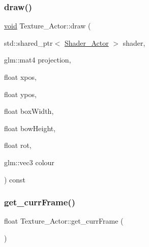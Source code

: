 \mbox{\label{classTexture__Actor_aa3cffcf3b8d123731999d986ab20afd1}} 
\subsubsection{\texorpdfstring{draw()}{draw()}\hspace{0.1cm}{\footnotesize\ttfamily [2/2]}}
{\footnotesize\ttfamily \hyperlink{imgui__impl__opengl3__loader_8h_ac668e7cffd9e2e9cfee428b9b2f34fa7}{void} Texture\+\_\+\+Actor\+::draw (\begin{DoxyParamCaption}\item[{std\+::shared\+\_\+ptr$<$ \hyperlink{classShader__Actor}{Shader\+\_\+\+Actor} $>$}]{shader,  }\item[{glm\+::mat4}]{projection,  }\item[{float}]{xpos,  }\item[{float}]{ypos,  }\item[{float}]{box\+Width,  }\item[{float}]{bow\+Height,  }\item[{float}]{rot,  }\item[{glm\+::vec3}]{colour }\end{DoxyParamCaption}) const}

\mbox{\label{classTexture__Actor_a8c5360d7d8edfa2a50832e457509c061}} 
\subsubsection{\texorpdfstring{get\+\_\+curr\+Frame()}{get\_currFrame()}}
{\footnotesize\ttfamily float Texture\+\_\+\+Actor\+::get\+\_\+curr\+Frame (\begin{DoxyParamCaption}{ }\end{DoxyParamCaption})\hspace{0.3cm}{\ttfamily [inline]}}

\mbox{\label{classTexture__Actor_ae38f4abc7a47da51410d66d10694a154}} 
